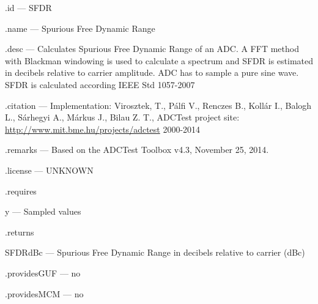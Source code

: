 \begin{tightdesc}
\item [\textsf{.id}] --- SFDR
\item [\textsf{.name}] --- Spurious Free Dynamic Range
\item [\textsf{.desc}] --- Calculates Spurious Free Dynamic Range of an ADC. A FFT method with Blackman windowing is used to calculate a spectrum and SFDR is estimated in decibels relative to carrier amplitude. ADC has to sample a pure sine wave. SFDR is calculated according IEEE Std 1057-2007
\item [\textsf{.citation}] --- Implementation: Virosztek, T., Pálfi V., Renczes B., Kollár I., Balogh L., Sárhegyi A., Márkus J., Bilau Z. T., ADCTest project site: \url{http://www.mit.bme.hu/projects/adctest} 2000-2014
\item [\textsf{.remarks}] --- Based on the ADCTest Toolbox v4.3, November 25, 2014.
\item [\textsf{.license}] --- UNKNOWN
\item [\textsf{.requires}] \rule{0em}{0em}
\begin{tightdesc}
\item [\textsf{y}] --- Sampled values
\end{tightdesc}
\item [\textsf{.returns}] \rule{0em}{0em}
\begin{tightdesc}
\item [\textsf{SFDRdBc}] --- Spurious Free Dynamic Range in decibels relative to carrier (dBc)
\end{tightdesc}
\item [\textsf{.providesGUF}] --- no
\item [\textsf{.providesMCM}] ---  no
\end{tightdesc}

